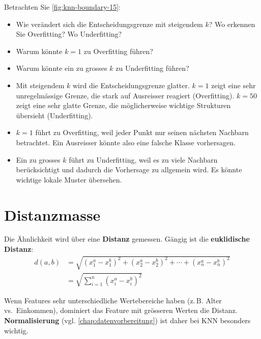 \begin{myexercise}
    Betrachten Sie \cref{fig:knn-boundary-15}:
    \begin{itemize}
        \item Wie verändert sich die Entscheidungsgrenze mit steigendem $k$? Wo erkennen Sie Overfitting? Wo Underfitting?
        \item Warum könnte $k=1$ zu Overfitting führen?
        \item Warum könnte ein zu grosses $k$ zu Underfitting führen?
    \end{itemize}
    \begin{myanswer}
        \begin{itemize}
            \item Mit steigendem $k$ wird die Entscheidungsgrenze glatter. $k=1$ zeigt eine sehr unregelmässige Grenze, die stark auf Ausreisser reagiert (Overfitting). $k=50$ zeigt eine sehr glatte Grenze, die möglicherweise wichtige Strukturen übersieht (Underfitting).
            \item $k=1$ führt zu Overfitting, weil jeder Punkt nur seinen nächsten Nachbarn betrachtet. Ein Ausreisser könnte also eine falsche Klasse vorhersagen.
            \item Ein zu grosses $k$ führt zu Underfitting, weil es zu viele Nachbarn berücksichtigt und dadurch die Vorhersage zu allgemein wird. Es könnte wichtige lokale Muster übersehen.
        \end{itemize}
    \end{myanswer}
\end{myexercise}

\section{Distanzmasse}

Die Ähnlichkeit wird über eine \textbf{Distanz} gemessen. Gängig ist die \textbf{euklidische Distanz}:
\[
    \begin{aligned}
        d(a, b) &= \sqrt{(x_1^a - x_1^b)^2 + (x_2^a - x_2^b)^2 + \cdots + (x_n^a - x_n^b)^2 } \\
                & = \sqrt{\sum_{i=1}^n (x_i^a - x_i^b)^2}
    \end{aligned}
\]

\begin{mycaution}
    Wenn Features sehr unterschiedliche Wertebereiche haben (z.\,B. Alter vs.\ Einkommen),
    dominiert das Feature mit grösseren Werten die Distanz.
    \textbf{Normalisierung} (vgl. \cref{chap:datenvorbereitung}) ist daher bei KNN besonders wichtig.
\end{mycaution}

